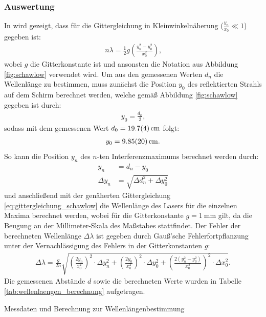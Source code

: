 \documentclass[11pt, a4paper]{article}
\numberwithin{equation}{section}
\begin{document}
\subsubsection{Auswertung}
In \cite{schawlow} wird gezeigt, dass für die Gittergleichung in Kleinwinkelnäherung ($\frac{y_n}{x_0} \ll 1$) gegeben ist:
\begin{align}
	n \lambda = \frac{1}{2} g \left( \frac{y_n^2 - y_0^2}{x_0^2} \right) \text{,}
	\label{eq:gittergleichung_schawlow}
\end{align}
wobei $g$ die Gitterkonstante ist und ansonsten die Notation aus Abbildung \ref{fig:schawlow} verwendet wird.
Um aus den gemessenen Werten $d_n$ die Wellenlänge zu bestimmen, muss zunächst die Position $y_0$ des reflektierten Strahls auf dem Schirm berechnet werden, welche gemäß Abbildung \ref{fig:schawlow} gegeben ist durch:
\begin{align}
	y_0 = \frac{d_0}{2} \text{,}
\end{align}
sodass mit dem gemessenen Wert $d_0 = \SI{19.7 +- 0.4}{\centi\metre}$ folgt:
\begin{align}
	y_0 = \SI{9.85 +- 0.20}{\centi\metre} \text{.}
\end{align}
So kann die Position $y_n$ des $n$-ten Interferenzmaximums berechnet werden durch:
\begin{align}
	y_n &= d_n - y_0 \\
	\Delta y_n &= \sqrt{\Delta d_n^2 + \Delta y_0^2}
\end{align}
und anschließend mit der genäherten Gittergleichung \ref{eq:gittergleichung_schawlow} die Wellenlänge des Lasers für die einzelnen Maxima berechnet werden, wobei für die Gitterkonstante $g = \SI{1}{\milli\metre}$ gilt, da die Beugung an der Millimeter-Skala des Maßstabes stattfindet. 
Der Fehler der berechneten Wellenlänge $\Delta \lambda$ ist gegeben durch Gauß'sche Fehlerfortpflanzung unter der Vernachlässigung des Fehlers in der Gitterkonstanten $g$:
\begin{align}
	\Delta \lambda = \frac{g}{2 n} \sqrt{\left( \frac{2 y_n}{x_0^2} \right)^2 \cdot \Delta y_n^2 + \left( \frac{2 y_0}{x_0^2} \right)^2 \cdot \Delta y_0^2 + \left(\frac{2\left(y_n^2 - y_0^2 \right)}{x_0^3}\right)^2 \cdot \Delta x_0^2} \text{.}
\end{align}
Die gemessenen Abstände $d$ sowie die berechneten Werte wurden in Tabelle \ref{tab:wellenlaengen_berechnung} aufgetragen.
\begin{table}[h]
	\centering
	
	\caption{Messdaten und Berechnung zur Wellenlängenbestimmung}
	\label{tab:wellenlaengen_berechnung}
\end{table}
\end{document}
